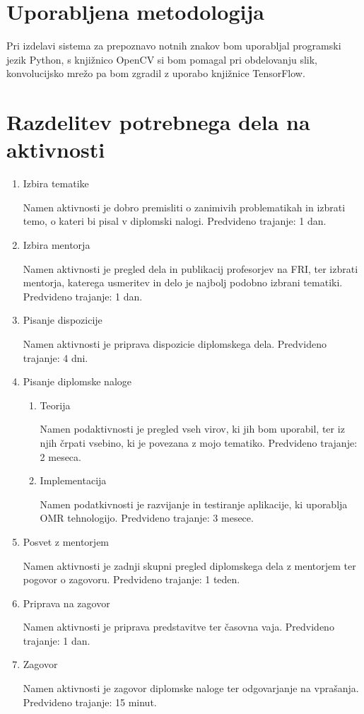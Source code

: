 \documentclass[11pt,a4paper]{article}
\begin{document}
\section{Uporabljena metodologija}

Pri izdelavi sistema za prepoznavo notnih znakov bom uporabljal programski jezik Python, s knjižnico OpenCV si bom pomagal pri obdelovanju slik, konvolucijsko mrežo pa bom zgradil z uporabo knjižnice TensorFlow.


\section{Razdelitev potrebnega dela na aktivnosti}

\begin{enumerate}
\item Izbira tematike

Namen aktivnosti je dobro premisliti o zanimivih problematikah in izbrati temo, o kateri bi pisal v diplomski nalogi. Predvideno trajanje: 1 dan.
\item Izbira mentorja

Namen aktivnosti je pregled dela in publikacij profesorjev na FRI, ter izbrati mentorja, katerega usmeritev in delo je najbolj podobno izbrani tematiki. Predvideno trajanje: 1 dan.
\item Pisanje dispozicije

Namen aktivnosti je priprava dispozicie diplomskega dela. Predvideno trajanje: 4 dni.

\item Pisanje diplomske naloge
	\begin{enumerate}
	\item Teorija
	
	Namen podaktivnosti je pregled vseh virov, ki jih bom uporabil, ter iz njih črpati vsebino, ki je povezana z mojo tematiko. Predvideno trajanje: 2 meseca.
	\item Implementacija
	
	Namen podatkivnosti je razvijanje in testiranje aplikacije, ki uporablja OMR tehnologijo. Predvideno trajanje: 3 mesece.
	\end{enumerate}
	
\item Posvet z mentorjem

Namen aktivnosti je zadnji skupni pregled diplomskega dela z mentorjem ter pogovor o zagovoru. Predvideno trajanje: 1 teden.

\item Priprava na zagovor

Namen aktivnosti je priprava predstavitve ter časovna vaja. Predvideno trajanje: 1 dan.
\item Zagovor

Namen aktivnosti je zagovor diplomske naloge ter odgovarjanje na vprašanja. Predvideno trajanje: 15 minut.
\end{enumerate}
\end{document}
